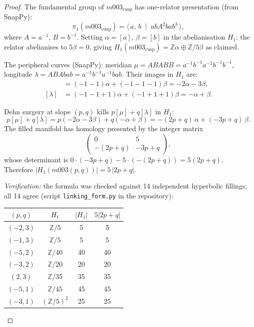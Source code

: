 \documentclass[11pt,a4paper]{article}
\theoremstyle{definition}
\newcommand{\ZZ}{\mathbb{Z}}
\newcommand{\Zfive}{\ZZ/5}
\newcommand{\Mcusp}{m003_{\mathrm{cusp}}}
\begin{document}
\begin{proof}
The fundamental group of $\Mcusp$ has one-relator presentation
(from SnapPy):
\[
  \pi_1(\Mcusp) = \langle\, a,\, b \;\mid\; ab A^2 b a b^3 \,\rangle,
\]
where $A=a^{-1}$, $B=b^{-1}$.
Setting $\alpha=[a]$, $\beta=[b]$ in the abelianisation $H_1$:
the relator abelianises to $5\beta=0$,
giving $H_1(\Mcusp) = \ZZ\alpha \oplus \ZZ/5\beta$ as claimed.

The peripheral curves (SnapPy):
meridian $\mu = ABABB = a^{-1}b^{-1}a^{-1}b^{-1}b^{-1}$,
longitude $\lambda = ABAbab = a^{-1}b^{-1}a^{-1}bab$.
Their images in $H_1$ are:
\begin{align*}
  [\mu] &= (-1-1)\alpha + (-1-1-1)\beta = -2\alpha - 3\beta, \\
  [\lambda] &= (-1-1+1)\alpha + (-1+1+1)\beta = -\alpha + \beta.
\end{align*}

Dehn surgery at slope $(p,q)$ kills $p[\mu]+q[\lambda]$ in $H_1$:
\[
  p[\mu]+q[\lambda]
  = p(-2\alpha-3\beta)+q(-\alpha+\beta)
  = -(2p+q)\,\alpha + (-3p+q)\,\beta.
\]
The filled manifold has homology presented by the integer matrix
\[
  \begin{pmatrix} 0 & 5 \\ -(2p+q) & -3p+q \end{pmatrix},
\]
whose determinant is
$0\cdot(-3p+q) - 5\cdot(-(2p+q)) = 5(2p+q)$.
Therefore $|H_1(m003(p,q))| = 5\,|2p+q|$.

\emph{Verification:} the formula was checked against 14
independent hyperbolic fillings; all 14 agree
(script \texttt{linking\_form.py} in the repository):
\begin{center}
\begin{tabular}{cccc}
\toprule
$(p,q)$ & $H_1$ & $|H_1|$ & $5|2p+q|$ \\
\midrule
$(-2,3)$ & $\Zfive$       &  5 &  5 \\
$(-1,3)$ & $\Zfive$       &  5 &  5 \\
$(-5,2)$ & $\ZZ/40$       & 40 & 40 \\
$(-3,2)$ & $\ZZ/20$       & 20 & 20 \\
$(2,3)$  & $\ZZ/35$       & 35 & 35 \\
$(-5,1)$ & $\ZZ/45$       & 45 & 45 \\
$(-3,1)$ & $(\Zfive)^2$   & 25 & 25 \\
\bottomrule
\end{tabular}
\end{center}
\end{proof}
\end{document}
